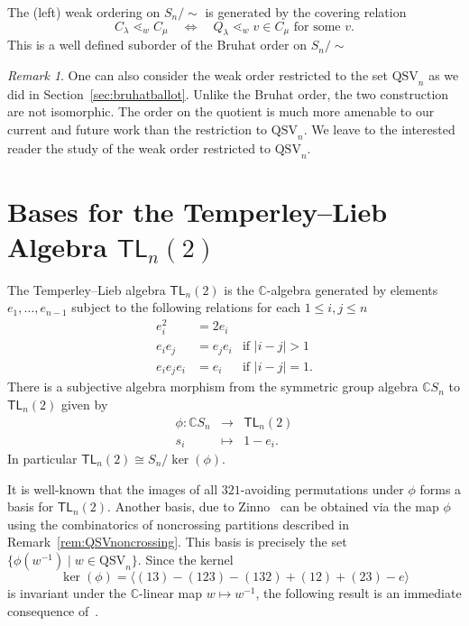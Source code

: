 \documentclass[12pt]{amsart}
\theoremstyle{definition}
\theoremstyle{remark}
\newtheorem{rem}[equation]{Remark}
\numberwithin{equation}{section}
\newcommand{\CC}{\mathbb{C}}
\newcommand{\TL}{\mathsf{TL}}
\newcommand{\QSV}{\mathrm{QSV}}
\begin{document}
The (left) weak ordering on $S_n/\!\!\sim$ is generated by the  covering relation
  $$ C_{\lambda} \lessdot_w C_{\mu} \quad\iff\quad  Q_\lambda \lessdot_w  v\in C_{\mu} \text{ for some } v.$$
 This is a well defined suborder of the Bruhat order on $S_n/\!\!\sim$
 
 \begin{rem} 
  One can also consider the weak order restricted to the set $\QSV_n$ as we did in Section~\ref{sec:bruhatballot}.
  Unlike the Bruhat order, the two construction are not isomorphic. The order on the quotient is much more amenable to our
  current and future work than the restriction to $\QSV_n$. We leave to the interested reader the study of the weak order
  restricted to $\QSV_n$.
 \end{rem}


\section{Bases for the Temperley--Lieb Algebra $\TL_{n}(2)$}
\label{sec:TLbasis}

The Temperley--Lieb algebra $\TL_{n}(2)$ is the $\CC$-algebra generated by elements $e_{1}, \ldots, e_{n-1}$ subject to the following relations for each $1 \le i, j \le n$
\[
\begin{array}{rll}
e_{i}^{2} &= 2 e_{i} \\
e_{i}e_{j} &= e_{j}e_{i} & \text{if $|i - j| > 1$} \\
e_{i} e_{j} e_{i} &= e_{i} & \text{if $|i - j| = 1$}.
\end{array}
\]
There is a subjective algebra morphism from the symmetric group algebra $\CC S_{n}$ to $\TL_{n}(2)$ given by 
\[
\begin{array}{rcl}
\phi: \CC S_{n} & \longrightarrow & \TL_{n}(2) \\
s_{i} & \longmapsto & 1 - e_{i}.
\end{array}
\]
In particular $\TL_{n}(2)\cong S_n/\ker(\phi)$.

It is well-known that the images of all $321$-avoiding permutations under $\phi$ forms a basis for $\TL_{n}(2)$.  
Another basis, due to Zinno~\cite{Zinno} can be obtained via the map $\phi$ using the combinatorics of noncrossing partitions described in Remark~\ref{rem:QSVnoncrossing}.  This basis is precisely the set $\{\phi(w^{-1}) \;|\; w \in \QSV_{n}\}$.  Since the kernel
\[
\ker(\phi) = \langle (13) - (123) - (132) + (12) + (23) - e \rangle
\]
is invariant under the $\CC$-linear map $w \mapsto w^{-1}$, the following result is an immediate consequence of~\cite[Theorem 2]{Zinno}.
\end{document}
